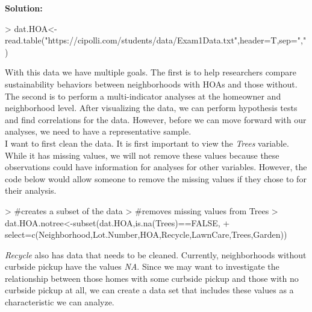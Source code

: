 \documentclass{article}
\begin{document}
\textbf{Solution:}
\begin{Schunk}
\begin{Sinput}
> dat.HOA<-read.table("https://cipolli.com/students/data/Exam1Data.txt",header=T,sep=",")
\end{Sinput}
\end{Schunk}

With this data we have multiple goals. The first is to help researchers compare sustainability behaviors between neighborhoods with HOAs and those without. The second is to perform a multi-indicator analyses at the homeowner and neighborhood level. After visualizing the data, we can perform hypothesis tests and find correlations for the data. However, before we can move forward with our analyses, we need to have a representative sample.
\\
I want to first clean the data. It is first important to view the \textit{Trees} variable. While it has missing values, we will not remove these values because these observations could have information for analyses for other variables. However, the code below would allow someone to remove the missing values if they chose to for their analysis.

\begin{Schunk}
\begin{Sinput}
> #creates a subset of the data
> #removes missing values from Trees
> dat.HOA.notree<-subset(dat.HOA,is.na(Trees)==FALSE,
+                  select=c(Neighborhood,Lot.Number,HOA,Recycle,LawnCare,Trees,Garden)) 
\end{Sinput}
\end{Schunk}


\textit{Recycle} also has data that needs to be cleaned. Currently, neighborhoods without curbside pickup have the values \textit{NA}. Since we may want to investigate the relationship between those homes with some curbside pickup and those with no curbside pickup at all, we can create a data set that includes these values as a characteristic we can analyze. 


\begin{Schunk}
\end{Schunk}
\end{document}
